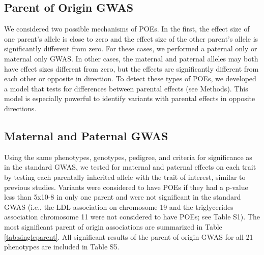 \subsection{Parent of Origin GWAS}\label{Parent of Origin GWAS}
We considered two possible mechanisms of POEs. In the first, the effect size of one parent's allele is close to zero and the effect size of the other parent's allele is significantly different from zero. For these cases, we performed a paternal only or maternal only GWAS. In other cases, the maternal and paternal alleles may both have effect sizes different from zero, but the effects are significantly different from each other or opposite in direction. To detect these types of POEs, we developed a model that tests for differences between parental effects (see Methods). This model is especially powerful to identify variants with parental effects in opposite directions.

\subsection{Maternal and Paternal GWAS}\label{Maternal and Paternal GWAS}
Using the same phenotypes, genotypes, pedigree, and criteria for significance as in the standard GWAS, we tested for maternal and paternal effects on each trait by testing each parentally inherited allele with the trait of interest, similar to previous studies\citep{Kong:2009kk,Zoledziewska:2015do,Garg2012a}. Variants were considered to have POEs if they had a p-value less than 5x10-8 in only one parent and were not significant in the standard GWAS (i.e., the LDL association on chromosome 19 and the triglycerides association chromosome 11 were not considered to have POEs; see Table S1). The most significant parent of origin associations are summarized in Table \ref{tab:singleparent}. All significant results of the parent of origin GWAS for all 21 phenotypes are included in Table S5. 



